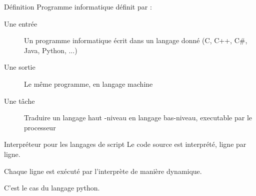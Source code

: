 \begin{frame}{Définition}
    Programme informatique définit par :
    \begin{description}
        \item [Une entrée] Un programme informatique écrit dans un langage donné (C, C++, C\#, Java, Python, ...)
        \item [Une sortie] Le même programme, en langage machine
        \item [Une tâche] Traduire un langage haut -niveau en langage bas-niveau, executable par le processeur
    \end{description}
\end{frame}

\begin{frame}{Interpréteur pour les langages de script}
    Le code source est interprété, ligne par ligne.

    Chaque ligne est exécuté par l'interprète de manière dynamique.

    C'est le cas du langage python.
\end{frame}

